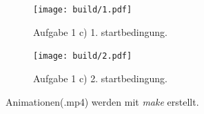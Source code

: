 \begin{figure}
  \texttt{[image: build/1.pdf]}
  \caption{Aufgabe 1 c) 1. startbedingung.}
  \label{fig:bild5}
\end{figure}

\begin{figure}
  \texttt{[image: build/2.pdf]}
  \caption{Aufgabe 1 c) 2. startbedingung.}
  \label{fig:bild5}
\end{figure}


Animationen(.mp4) werden mit \textit{make} erstellt.




